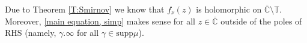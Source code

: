 \documentclass[11pt]{article}
\newtheorem{lemma}{Lemma}[section]
\begin{document}
%
%	

Due to Theorem \ref{T:Smirnov} we know that $f_\nu(z)$ is holomorphic on $\overline{\mathbb{C}} \setminus \mathbb{T}$. Moreover, \eqref{main equation, simp} makes sense for all $z \in \overline{\mathbb{C}}$ outside of the poles of RHS (namely, $\gamma.\infty$ for all $\gamma \in \text{supp} \mu$). 
\end{document}
